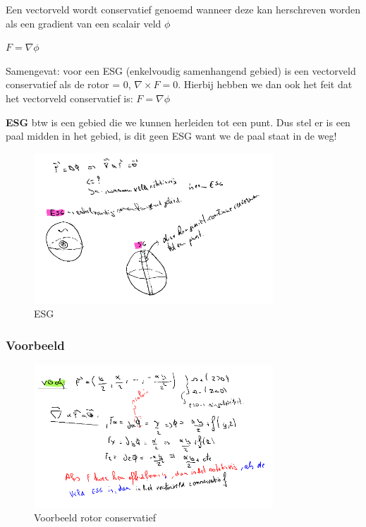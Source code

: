 \documentclass[a4paper]{article}
\begin{document}
Een vectorveld wordt conservatief genoemd wanneer deze kan herschreven worden als een gradient van een scalair veld $\phi$

$F = \nabla \phi$

Samengevat: voor een ESG (enkelvoudig samenhangend gebied) is een vectorveld conservatief als de rotor = 0, $\nabla \times F = 0$. Hierbij hebben we dan ook het feit dat het vectorveld conservatief is: $F = \nabla \phi$

\textbf{ESG} btw is een gebied die we kunnen herleiden tot een punt. Dus stel er is een paal midden in het gebied, is dit geen ESG want we de paal staat in de weg!


\begin{figure}[H]
	\centering
	\includegraphics[width=0.8\textwidth]{assets/ESG.png}
	\caption{ESG}
	\label{fig:esg}
\end{figure}

\subsubsection{Voorbeeld}

\begin{figure}[H]
	\centering
	\includegraphics[width=0.8\textwidth]{assets/voorbeeld_rotor_conservatief.png}
	\caption{Voorbeeld rotor conservatief}
	\label{fig:voorbeeld_rotor_conservatief}
\end{figure}
\end{document}

